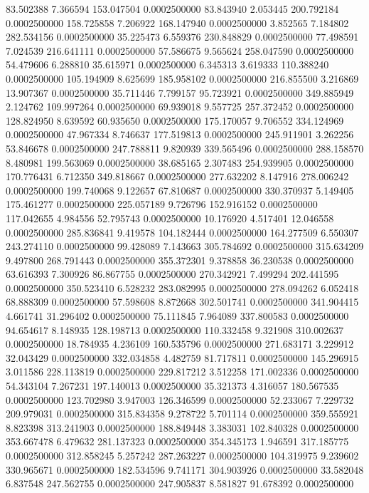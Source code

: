 83.502388 7.366594 153.047504 0.0002500000
83.843940 2.053445 200.792184 0.0002500000
158.725858 7.206922 168.147940 0.0002500000
3.852565 7.184802 282.534156 0.0002500000
35.225473 6.559376 230.848829 0.0002500000
77.498591 7.024539 216.641111 0.0002500000
57.586675 9.565624 258.047590 0.0002500000
54.479606 6.288810 35.615971 0.0002500000
6.345313 3.619333 110.388240 0.0002500000
105.194909 8.625699 185.958102 0.0002500000
216.855500 3.216869 13.907367 0.0002500000
35.711446 7.799157 95.723921 0.0002500000
349.885949 2.124762 109.997264 0.0002500000
69.939018 9.557725 257.372452 0.0002500000
128.824950 8.639592 60.935650 0.0002500000
175.170057 9.706552 334.124969 0.0002500000
47.967334 8.746637 177.519813 0.0002500000
245.911901 3.262256 53.846678 0.0002500000
247.788811 9.820939 339.565496 0.0002500000
288.158570 8.480981 199.563069 0.0002500000
38.685165 2.307483 254.939905 0.0002500000
170.776431 6.712350 349.818667 0.0002500000
277.632202 8.147916 278.006242 0.0002500000
199.740068 9.122657 67.810687 0.0002500000
330.370937 5.149405 175.461277 0.0002500000
225.057189 9.726796 152.916152 0.0002500000
117.042655 4.984556 52.795743 0.0002500000
10.176920 4.517401 12.046558 0.0002500000
285.836841 9.419578 104.182444 0.0002500000
164.277509 6.550307 243.274110 0.0002500000
99.428089 7.143663 305.784692 0.0002500000
315.634209 9.497800 268.791443 0.0002500000
355.372301 9.378858 36.230538 0.0002500000
63.616393 7.300926 86.867755 0.0002500000
270.342921 7.499294 202.441595 0.0002500000
350.523410 6.528232 283.082995 0.0002500000
278.094262 6.052418 68.888309 0.0002500000
57.598608 8.872668 302.501741 0.0002500000
341.904415 4.661741 31.296402 0.0002500000
75.111845 7.964089 337.800583 0.0002500000
94.654617 8.148935 128.198713 0.0002500000
110.332458 9.321908 310.002637 0.0002500000
18.784935 4.236109 160.535796 0.0002500000
271.683171 3.229912 32.043429 0.0002500000
332.034858 4.482759 81.717811 0.0002500000
145.296915 3.011586 228.113819 0.0002500000
229.817212 3.512258 171.002336 0.0002500000
54.343104 7.267231 197.140013 0.0002500000
35.321373 4.316057 180.567535 0.0002500000
123.702980 3.947003 126.346599 0.0002500000
52.233067 7.229732 209.979031 0.0002500000
315.834358 9.278722 5.701114 0.0002500000
359.555921 8.823398 313.241903 0.0002500000
188.849448 3.383031 102.840328 0.0002500000
353.667478 6.479632 281.137323 0.0002500000
354.345173 1.946591 317.185775 0.0002500000
312.858245 5.257242 287.263227 0.0002500000
104.319975 9.239602 330.965671 0.0002500000
182.534596 9.741171 304.903926 0.0002500000
33.582048 6.837548 247.562755 0.0002500000
247.905837 8.581827 91.678392 0.0002500000
